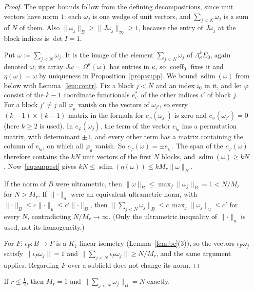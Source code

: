 \documentclass[11pt]{amsart}
\theoremstyle{definition}
\theoremstyle{remark}
\numberwithin{equation}{section}
\newcommand{\coeff}{\operatorname{coeff}}
\newcommand{\sdim}{\operatorname{sdim}}
\newcommand{\norm}[1]{\lVert #1\rVert}
\begin{document}
\begin{proof}
The upper bounds follow from the defining decompositions, since unit vectors have norm $1$: each $\omega_j$ is one
wedge of unit vectors, and $\sum_{j<N}\omega_j$ is a sum of $N$ of them. Also
$\norm{\omega_j}_B\ge\norm{J\omega_j}_\infty\ge1$, because the entry of $J\omega_j$ at the block indices is $\det I=1$.

Put $\omega:=\sum_{j<N}\omega_j$. It is the image of the element $\sum_{j<N}\omega_j$ of $\Lambda^k_\kappa E_0$, again
denoted $\omega$; its array $J\omega=\Omega^\kappa(\omega)$ has entries in $\kappa$, so $\coeff_0$ fixes it and
$\eta(\omega)=\omega$ by uniqueness in Proposition~\ref{prop:supp}. We bound $\sdim(\omega)$ from below with Lemma~\ref{lem:contr}. Fix a
block $j<N$ and an index $i_0$ in it, and let $\varphi$ consist of the $k-1$ coordinate functionals $e^*_{i'}$ of the
other indices $i'$ of block $j$. For a block $j'\ne j$ all $\varphi_a$ vanish on the vectors of $\omega_{j'}$, so every
$(k-1)\times(k-1)$ matrix in the formula for $c_\varphi(\omega_{j'})$ is zero and $c_\varphi(\omega_{j'})=0$ (here $k\ge2$
is used). In $c_\varphi(\omega_j)$, the term of the vector $e_{i_0}$ has a permutation matrix, with determinant $\pm1$, and
every other term has a matrix containing the column of $e_{i_0}$, on which all $\varphi_a$ vanish. So
$c_\varphi(\omega)=\pm e_{i_0}$. The span of the $c_\varphi(\omega)$ therefore contains the $kN$ unit vectors of the first $N$
blocks, and $\sdim(\omega)\ge kN$. Now~\eqref{eq:suppest} gives
$kN\le\sdim(\eta(\omega))\le kM_r\norm\omega_B$.

If the norm of $B$ were ultrametric, then $\norm\omega_B\le\max_j\norm{\omega_j}_B=1<N/M_r$ for $N>M_r$. If $\norm\cdot_u$ were
an equivalent ultrametric norm, with $\norm\cdot_B\le c\norm\cdot_u\le c'\norm\cdot_B$, then
$\norm{\sum_{j<N}\omega_j}_B\le c\,\max_j\norm{\omega_j}_u\le c'$ for every $N$, contradicting $N/M_r\to\infty$. (Only
the ultrametric inequality of $\norm\cdot_u$ is used, not its homogeneity.)

For $F$: $\iota_F\colon B\to F$ is a $K_1$\nobreakdash-linear isometry (Lemma~\ref{lem:bc}(3)), so the vectors $\iota_F\omega_j$
satisfy $\norm{\iota_F\omega_j}=1$ and $\norm{\sum_{j<N}\iota_F\omega_j}\ge N/M_r$, and the same argument applies.
Regarding $F$ over a subfield does not change its norm.
\end{proof}

If $r\le\frac12$, then $M_r=1$ and $\norm{\sum_{j<N}\omega_j}_B=N$ exactly.
\end{document}
